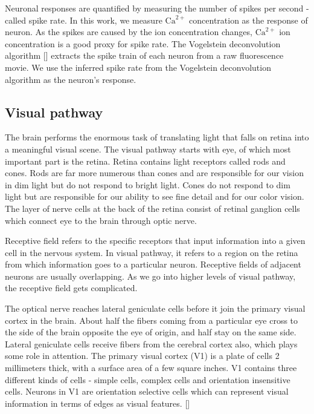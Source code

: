 \documentclass[MTech]{iitmdiss}
\begin{document}
Neuronal responses are quantified by measuring the number of spikes per second - called spike rate. In this work, we measure $\text{Ca}^{2+}$ concentration as the response of neuron. As the spikes are caused by the ion concentration changes, $\text{Ca}^{2+}$ ion concentration is a good proxy for spike rate. The Vogelstein deconvolution algorithm [\cite{vogelstein2010fast}] extracts the spike train of each neuron from a raw fluorescence movie. We use the inferred spike rate from the Vogelstein deconvolution algorithm as the neuron's response.

\subsection{Visual pathway} %
\label{sub:visual_pathway}
The brain performs the enormous task of translating light that falls on retina into a meaningful visual scene. The visual pathway starts with eye, of which most important part is the retina. Retina contains light receptors called rods and cones. Rods are far more numerous than cones and are responsible for our vision in dim light but do not respond to bright light. Cones do not respond to dim light but are responsible for our ability to see fine detail and for our color vision. The layer of nerve cells at the back of the retina consist of retinal ganglion cells which connect eye to the brain through optic nerve.

Receptive field refers to the specific receptors that input information into a given cell in the nervous system. In visual pathway, it refers to a region on the retina from which information goes to a particular neuron. Receptive fields of adjacent neurons are usually  overlapping. As we go into higher levels of visual pathway, the receptive field gets complicated.

The optical nerve reaches lateral geniculate cells before it join the primary visual cortex in the brain. About half the fibers coming from a particular eye cross to the side of the brain opposite the eye of origin, and half stay on the same side. Lateral geniculate cells receive fibers from the cerebral cortex also, which plays some role in attention. The primary visual cortex (V1) is a plate of cells 2 millimeters thick, with a surface area of a few square inches. V1 contains three different kinds of cells - simple cells, complex cells and orientation insensitive cells. Neurons in V1 are orientation selective cells which can represent visual information in terms of edges as visual features. [\cite{hubel1995eye}]
\end{document}
